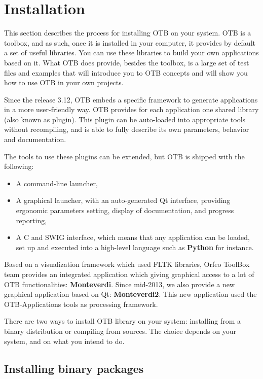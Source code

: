 \chapter{Installation}
\label{chapter:Installation}

This section describes the process for installing OTB on your system. OTB is a toolbox, and as such, once it is installed in your computer, it provides by default a set of useful libraries. You can use these libraries to build your own applications based on it. What OTB does provide, besides the toolbox, is a large set of test files and examples that will introduce you to OTB concepts and will show you how to use OTB in your own projects.

Since the release 3.12, OTB embeds a specific framework to generate applications in a more user-friendly way. OTB provides for each application one shared library (also known as plugin). This plugin can be auto-loaded into appropriate tools without recompiling, and is able to fully describe its own parameters, behavior and documentation.

The tools to use these plugins can be extended, but OTB is shipped with the
following:
\begin{itemize}
\item A command-line launcher,
\item A graphical launcher, with an auto-generated Qt interface,
  providing ergonomic parameters setting, display of documentation,
  and progress reporting,
\item A C and SWIG interface, which means that any application can be
  loaded, set up and executed into a high-level language such as \textbf{Python}
  for instance.
\end{itemize}

Based on a visualization framework which used FLTK libraries, Orfeo ToolBox team provides an integrated application which giving graphical access to a lot of OTB functionalities: \textbf{Monteverdi}. Since mid-2013, we also provide a new graphical application based on Qt: \textbf{Monteverdi2}. This new application used the OTB-Applications tools as processing framework. 
   
There are two ways to install OTB library on your system: installing from a binary distribution or compiling from sources. The choice depends on your system, and on what you intend to do.


\section{Installing binary packages}
\label{sec:install_binaries}

